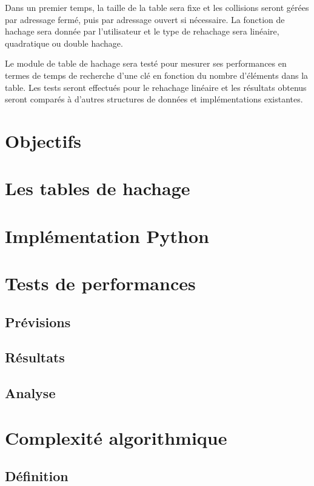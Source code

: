 \documentclass{article}
\begin{document}
    Dans un premier temps, la taille de la table sera fixe et les collisions seront gérées par adressage fermé, puis par adressage ouvert si nécessaire.
    La fonction de hachage sera donnée par l'utilisateur et le type de rehachage sera linéaire, quadratique ou double hachage.

    Le module de table de hachage sera testé pour mesurer ses performances en termes de temps de recherche d'une clé en fonction du nombre d'éléments dans la table.
    Les tests seront effectués pour le rehachage linéaire et les résultats obtenus seront comparés à d'autres structures de données et implémentations existantes.

    \section{Objectifs}\label{sec:objectifs}
    \section{Les tables de hachage}\label{sec:hachtable}
    \section{Implémentation Python}\label{sec:implementation}
    \section{Tests de performances}\label{sec:tests}
        \subsection{Prévisions}\label{subsec:previsions}
        \subsection{Résultats}\label{subsec:resultats}
        \subsection{Analyse}\label{subsec:analyse}
    \section{Complexité algorithmique}\label{sec:complexite}
        \subsection{Définition}\label{subsec:def}
\end{document}
